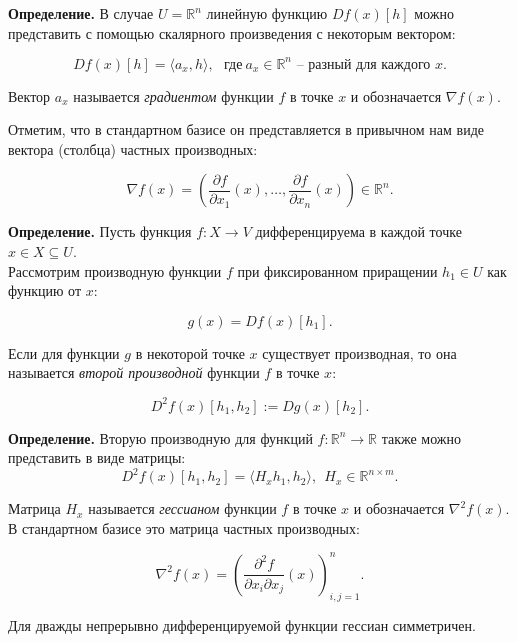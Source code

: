 \textbf{Определение.} В случае $U = \mathbb{R}^n$ линейную функцию $Df(x)[h]$ можно представить с помощью скалярного произведения с некоторым вектором:

$$Df(x)[h] = \langle a_x, h\rangle,\ \ \ \text{где}\ a_x\in\mathbb{R}^n\text{ -- разный для каждого } x. $$

Вектор $a_x$ называется \textit{градиентом}  функции $f$ в точке $x$ и обозначается $\nabla f(x)$.

Отметим, что в стандартном базисе он представляется в привычном нам виде вектора (столбца) частных производных:

$$\nabla f(x) = \left(\dfrac{\partial f}{\partial x_1}(x),\ldots,\dfrac{\partial f}{\partial x_n}(x)\right)\in \mathbb{R}^n.$$
\bigskip

\textbf{Определение.} Пусть функция $f: X \to V$ дифференцируема в каждой точке $x\in X \subseteq U$. \\
Рассмотрим производную функции $f$ при фиксированном приращении $h_1\in U$ как функцию от $x$:

$$g(x) = Df(x)[h_1].$$

Если для функции $g$ в некоторой точке $x$ существует производная, то она называется \textit{второй производной} функции $f$ в точке $x$:

$$D^2 f(x) [h_1, h_2] := Dg(x)[h_2].$$
\bigskip

\textbf{Определение.} Вторую производную для функций $f :  \mathbb{R}^n\to\mathbb{R}$ также можно представить в виде матрицы:
$$D^2f(x)[h_1, h_2] = \langle H_xh_1, h_2\rangle,\ \ H_x\in\mathbb{R}^{n\times m}.$$

Матрица $H_x$ называется \textit{гессианом} функции $f$ в точке $x$ и обозначается $\nabla^2f(x).$ В стандартном базисе это матрица частных производных:

$$\nabla^2f(x) = \left(\dfrac{\partial^2 f}{\partial x_i\partial x_j}(x)\right)_{i,j = 1}^n.$$

Для дважды непрерывно дифференцируемой функции гессиан симметричен.